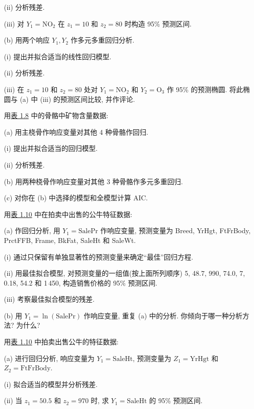 
\noindent (ii) 分析残差.

\noindent (iii) 对 $Y_1=\mathrm{NO}_2$ 在 $z_1=10$ 和 $z_2=80$ 时构造 95\% 预测区间.

\noindent (b) 用两个响应 $Y_1,Y_2$ 作多元多重回归分析.

\noindent (i) 提出并拟合适当的线性回归模型.

\noindent (ii) 分析残差.

\noindent (iii) 在 $z_1=10$ 和 $z_2=80$ 处对 $Y_1=\mathrm{NO}_2$ 和 $Y_2=\mathrm{O}_3$ 作 95\% 的预测椭圆. 将此椭圆与 (a) 中 (iii) 的预测区间比较, 并作评论.

\medskip
{}\quad 用\hyperref[tab:1.8]{表 1.8} 中的骨骼中矿物含量数据:

\noindent (a) 用主桡骨作响应变量对其他 4 种骨骼作回归.

\noindent (i) 提出并拟合适当的回归模型.

\noindent (ii) 分析残差.

\noindent (b) 用两种桡骨作响应变量对其他 3 种骨骼作多元多重回归.

\noindent (c) 对你在 (b) 中选择的模型和全模型计算 AIC.

\medskip
{}\quad 用\hyperref[tab:1.10]{表 1.10} 中在拍卖中出售的公牛特征数据:

\noindent (a) 作回归分析, 用 $Y_1=\mathrm{SalePr}$ 作响应变量, 预测变量为 Breed, YrHgt, FtFrBody, PrctFFB, Frame, BkFat, SaleHt 和 SaleWt.

\noindent (i) 通过只保留有单独显著性的预测变量来确定“最佳”回归方程.

\noindent (ii) 用最佳拟合模型, 对预测变量的一组值(按上面所列顺序) 5, 48.7, 990, 74.0, 7, 0.18, 54.2 和 1\,450, 构造销售价格的 95\% 预测区间.

\noindent (iii) 考察最佳拟合模型的残差.

\noindent (b) 用 $Y_1=\ln(\mathrm{SalePr})$ 作响应变量, 重复 (a) 中的分析. 你倾向于哪一种分析方法? 为什么?

\medskip
{}\quad 用\hyperref[tab:1.10]{表 1.10} 中拍卖出售公牛的特征数据:

\noindent (a) 进行回归分析, 响应变量为 $Y_1=\mathrm{SaleHt}$, 预测变量为 $Z_1=\mathrm{YrHgt}$ 和 $Z_2=\mathrm{FtFrBody}$.

\noindent (i) 拟合适当的模型并分析残差.

\noindent (ii) 当 $z_1=50.5$ 和 $z_2=970$ 时, 求 $Y_1=\mathrm{SaleHt}$ 的 95\% 预测区间.

